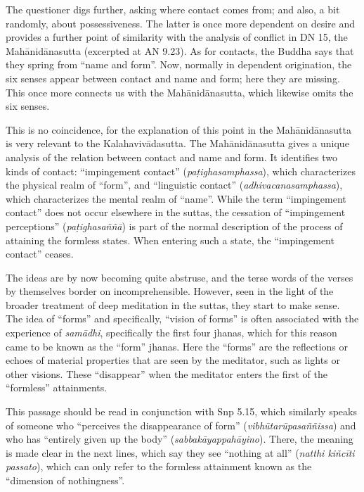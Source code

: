 \documentclass[12pt,openany]{book}%
\begin{document}
The questioner digs further, asking where contact comes from; and also, a bit randomly, about possessiveness. The latter is once more dependent on desire and provides a further point of similarity with the analysis of conflict in DN 15, the \textsanskrit{Mahānidānasutta} (excerpted at AN 9.23). As for contacts, the Buddha says that they spring from “name and form”. Now, normally in dependent origination, the six senses appear between contact and name and form; here they are missing. This once more connects us with the \textsanskrit{Mahānidānasutta}, which likewise omits the six senses.

This is no coincidence, for the explanation of this point in the \textsanskrit{Mahānidānasutta} is very relevant to the \textsanskrit{Kalahavivādasutta}. The \textsanskrit{Mahānidānasutta} gives a unique analysis of the relation between contact and name and form. It identifies two kinds of contact: “impingement contact” (\textit{\textsanskrit{paṭighasamphassa}}), which characterizes the physical realm of “form”, and “linguistic contact” (\textit{adhivacanasamphassa}), which characterizes the mental realm of “name”. While the term “impingement contact” does not occur elsewhere in the suttas, the cessation of “impingement perceptions” (\textit{\textsanskrit{paṭighasaññā}}) is part of the normal description of the process of attaining the formless states. When entering such a state, the “impingement contact” ceases.

The ideas are by now becoming quite abstruse, and the terse words of the verses by themselves border on incomprehensible. However, seen in the light of the broader treatment of deep meditation in the suttas, they start to make sense. The idea of “forms” and specifically, “vision of forms” is often associated with the experience of \textit{\textsanskrit{samādhi}}, specifically the first four jhanas, which for this reason came to be known as the “form” jhanas. Here the “forms” are the reflections or echoes of material properties that are seen by the meditator, such as lights or other visions. These “disappear” when the meditator enters the first of the “formless” attainments.

This passage should be read in conjunction with Snp 5.15, which similarly speaks of someone who “perceives the disappearance of form” (\textit{\textsanskrit{vibhūtarūpasaññissa}}) and who has “entirely given up the body” (\textit{\textsanskrit{sabbakāyappahāyino}}). There, the meaning is made clear in the next lines, which say they see “nothing at all” (\textit{natthi \textsanskrit{kiñcīti} passato}), which can only refer to the formless attainment known as the “dimension of nothingness”.
\end{document}
